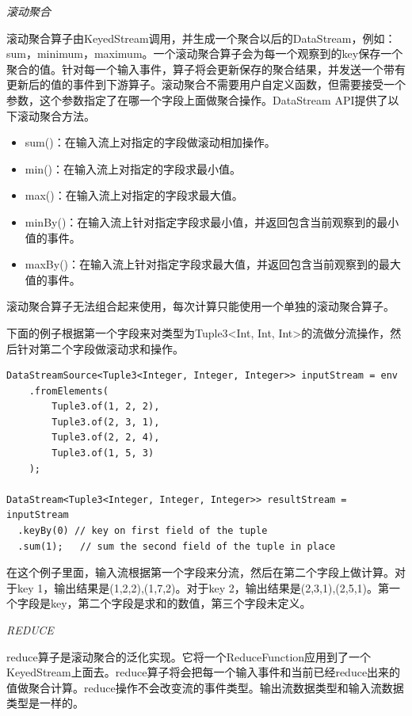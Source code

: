 \documentclass[cn,11pt,chinese]{elegantbook}
\begin{document}
\textit{滚动聚合}

滚动聚合算子由KeyedStream调用，并生成一个聚合以后的DataStream，例如：sum，minimum，maximum。一个滚动聚合算子会为每一个观察到的key保存一个聚合的值。针对每一个输入事件，算子将会更新保存的聚合结果，并发送一个带有更新后的值的事件到下游算子。滚动聚合不需要用户自定义函数，但需要接受一个参数，这个参数指定了在哪一个字段上面做聚合操作。DataStream API提供了以下滚动聚合方法。

\begin{itemize}
    \item sum()：在输入流上对指定的字段做滚动相加操作。
    \item min()：在输入流上对指定的字段求最小值。
    \item max()：在输入流上对指定的字段求最大值。
    \item minBy()：在输入流上针对指定字段求最小值，并返回包含当前观察到的最小值的事件。
    \item maxBy()：在输入流上针对指定字段求最大值，并返回包含当前观察到的最大值的事件。
\end{itemize}

滚动聚合算子无法组合起来使用，每次计算只能使用一个单独的滚动聚合算子。

下面的例子根据第一个字段来对类型为Tuple3<Int, Int, Int>的流做分流操作，然后针对第二个字段做滚动求和操作。

\begin{verbatim}
DataStreamSource<Tuple3<Integer, Integer, Integer>> inputStream = env
    .fromElements(
        Tuple3.of(1, 2, 2),
        Tuple3.of(2, 3, 1),
        Tuple3.of(2, 2, 4),
        Tuple3.of(1, 5, 3)
    );

DataStream<Tuple3<Integer, Integer, Integer>> resultStream = inputStream
  .keyBy(0) // key on first field of the tuple
  .sum(1);   // sum the second field of the tuple in place
\end{verbatim}

在这个例子里面，输入流根据第一个字段来分流，然后在第二个字段上做计算。对于key 1，输出结果是(1,2,2),(1,7,2)。对于key 2，输出结果是(2,3,1),(2,5,1)。第一个字段是key，第二个字段是求和的数值，第三个字段未定义。

\textit{REDUCE}

reduce算子是滚动聚合的泛化实现。它将一个ReduceFunction应用到了一个KeyedStream上面去。reduce算子将会把每一个输入事件和当前已经reduce出来的值做聚合计算。reduce操作不会改变流的事件类型。输出流数据类型和输入流数据类型是一样的。
\end{document}

